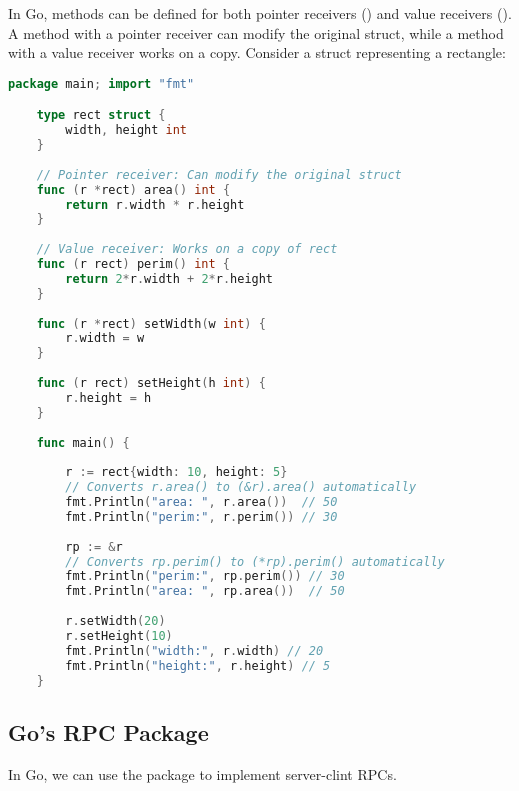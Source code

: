 \begin{Def}

    In Go, methods can be defined for both pointer receivers () and value receivers (). A method with a pointer receiver can modify the original struct, while a method with a value receiver works on a copy.
    Consider a struct representing a rectangle:
    
    \begin{lstlisting}[language=Go, numbers=none]
    package main; import "fmt"

    type rect struct {
        width, height int
    }
    
    // Pointer receiver: Can modify the original struct
    func (r *rect) area() int {
        return r.width * r.height
    }
    
    // Value receiver: Works on a copy of rect
    func (r rect) perim() int {
        return 2*r.width + 2*r.height
    }
    
    func (r *rect) setWidth(w int) {
        r.width = w
    }
    
    func (r rect) setHeight(h int) {
        r.height = h
    }
    
    func main() {
        
        r := rect{width: 10, height: 5}
        // Converts r.area() to (&r).area() automatically
        fmt.Println("area: ", r.area())  // 50
        fmt.Println("perim:", r.perim()) // 30
    
        rp := &r
        // Converts rp.perim() to (*rp).perim() automatically
        fmt.Println("perim:", rp.perim()) // 30
        fmt.Println("area: ", rp.area())  // 50
    
        r.setWidth(20)
        r.setHeight(10)
        fmt.Println("width:", r.width) // 20
        fmt.Println("height:", r.height) // 5
    }
    \end{lstlisting}
    
    \end{Def}
    
    \newpage 

    \subsection{Go's RPC Package}
    In Go, we can use the  package to implement server-clint RPCs.

